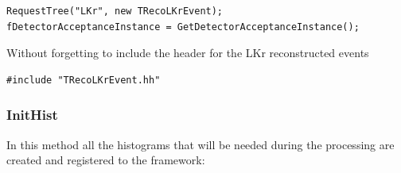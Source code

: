 \begin{lstlisting}
RequestTree("LKr", new TRecoLKrEvent);
fDetectorAcceptanceInstance = GetDetectorAcceptanceInstance();
\end{lstlisting}

Without forgetting to include the header for the LKr reconstructed events

\begin{lstlisting}
#include "TRecoLKrEvent.hh"
\end{lstlisting}


\subsubsection{InitHist}
In this method all the histograms that will be needed during the processing are created and
registered to the framework:

